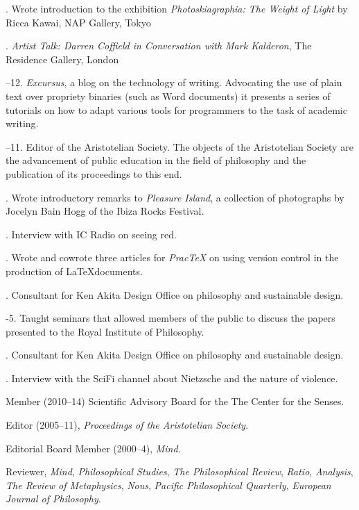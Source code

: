 \documentclass[11pt]{article}
\begin{document}
. Wrote introduction to the exhibition \emph{Photoskiagraphia: The Weight of Light} by Ricca Kawai, NAP Gallery, Tokyo

. \emph{Artist Talk: Darren Coffield in Conversation with Mark Kalderon}, The Residence Gallery, London

--12. \emph{Excursus}, a blog on the technology of writing. Advocating the use of plain text over propriety binaries (such as Word documents) it presents a series of tutorials on how to adapt various tools for programmers to the task of academic writing.

--11. Editor of the Aristotelian Society. The objects of the Aristotelian Society are the advancement of public education in the field of philosophy and the publication of its proceedings to this end. 

. Wrote introductory remarks to \emph{Pleasure Island}, a collection of photographs by Jocelyn Bain Hogg of the Ibiza Rocks Festival.

. Interview with IC Radio on seeing red.

. Wrote and cowrote three articles for \emph{PracTeX} on using version control in the production of \LaTeX documents.

. Consultant for Ken Akita Design Office on philosophy and sustainable design.

-5. Taught seminars that allowed members of the public to discuss the papers presented to the Royal Institute of Philosophy.

. Consultant for Ken Akita Design Office on philosophy and sustainable design.

. Interview with the SciFi channel about Nietzsche and the nature of violence.

\bigskip

\medskip


\ind Member (2010--14) Scientific Advisory Board for the The Center for the Senses.

\ind Editor (2005--11), \emph{Proceedings of the Aristotelian Society}.

\ind Editorial Board Member (2000--4), \emph{Mind}. 

\ind Reviewer, \emph{Mind}, \emph{Philosophical Studies},
\emph{The Philosophical Review}, \emph{Ratio}, \emph{Analysis}, \emph{The Review of Metaphysics}, \emph{Nous}, \emph{Pacific Philosophical Quarterly}, \emph{European Journal of Philosophy}.
\end{document}
